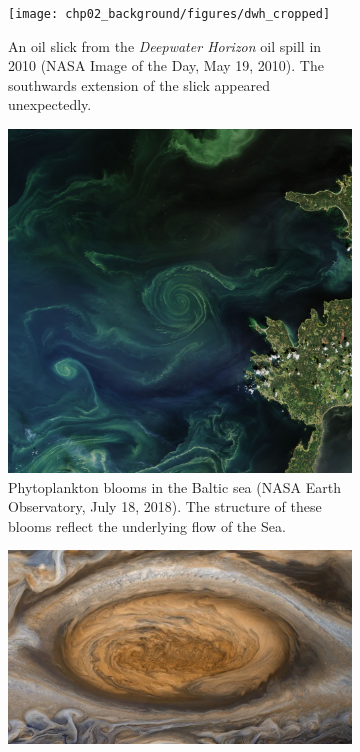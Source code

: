 \begin{figure}
	\begin{center}
		\begin{subfigure}[t]{0.49\textwidth}
			\texttt{[image: chp02\_background/figures/dwh\_cropped]}
			\caption{An oil slick from the \emph{Deepwater Horizon} oil spill in 2010 (NASA Image of the Day, May 19, 2010).
				The southwards extension of the slick appeared unexpectedly.}
			\label{fig:lcs_deepwater}
		\end{subfigure}
		\begin{subfigure}[t]{0.49\textwidth}
			\includegraphics[width=\textwidth]{chp02_background/figures/photoplankton}
			\caption{Phytoplankton blooms in the Baltic sea (NASA Earth Observatory, July 18, 2018).
				The structure of these blooms reflect the underlying flow of the Sea.}
			\label{fig:lcs_phyto}
		\end{subfigure}
		\begin{subfigure}[t]{\textwidth}
			\includegraphics[width=\textwidth]{chp02_background/figures/red_spot.png}

\end{subfigure}
\end{center}
\end{figure}
